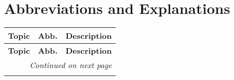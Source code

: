\setlength{\headheight}{12.71342pt}
\addtolength{\topmargin}{-0.71342pt}

\chapter{Abbreviations and Explanations}

\begin{longtable}{| p{5cm} | p{2cm} | p{7.5cm} |}
    \hline
    \textbf{Topic} & \textbf{Abb.} & \textbf{Description} \\ 
    \hline
    \endfirsthead
    
    \hline
    \textbf{Topic} & \textbf{Abb.} & \textbf{Description} \\ 
    \hline
    \endhead
    
    \hline \multicolumn{3}{r}{\textit{Continued on next page}} \\ 
    \endfoot
    
    \hline
    \endlastfoot
    

\end{longtable}
